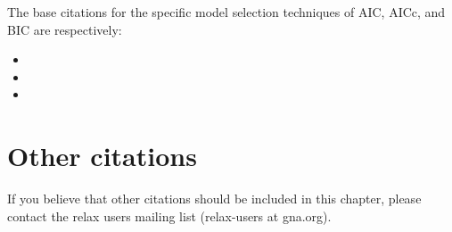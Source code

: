 The base citations for the specific model selection techniques of AIC, AICc, and BIC are respectively:

\begin{itemize}
\item {}
\item {}
\item {}
\end{itemize}




\section{Other citations}

If you believe that other citations should be included in this chapter, please contact the relax users mailing list (relax-users at gna.org).

